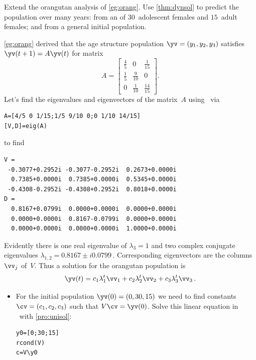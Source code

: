 \begin{example} \label{eg:orangs}
Extend the orangutan analysis of \autoref{eg:orang}. 
Use \autoref{thm:dynsol} to predict the population over many years: from an  of \(30\)~adolescent females and \(15\)~adult females; and from a general initial population.
\begin{solution} 
\autoref{eg:orang} derived that the age structure population \(\yv=(y_1,y_2,y_3)\) satisfies \(\yv(t+1)=A\yv(t)\) for matrix
\begin{equation*}
A=\begin{bmatrix} \frac45&0&\frac1{15}
\\\frac15&\frac9{10}&0
\\0&\frac1{10}&\frac{14}{15} \end{bmatrix}.
\end{equation*}
Let's find the eigenvalues and eigenvectors of the matrix~\(A\) using \script\ via
\begin{verbatim}
A=[4/5 0 1/15;1/5 9/10 0;0 1/10 14/15]
[V,D]=eig(A)
\end{verbatim}
\setbox\ajrqrbox\hbox{}%
\marginpar{\usebox{\ajrqrbox}}%
to find
\begin{verbatim}
V =
 -0.3077+0.2952i -0.3077-0.2952i  0.2673+0.0000i
  0.7385+0.0000i  0.7385+0.0000i  0.5345+0.0000i
 -0.4308-0.2952i -0.4308+0.2952i  0.8018+0.0000i
D =
  0.8167+0.0799i  0.0000+0.0000i  0.0000+0.0000i
  0.0000+0.0000i  0.8167-0.0799i  0.0000+0.0000i
  0.0000+0.0000i  0.0000+0.0000i  1.0000+0.0000i
\end{verbatim}
Evidently there is one real eigenvalue of \(\lambda_3=1\) and two complex conjugate eigenvalues \(\lambda_{1,2}=0.8167\pm i0.0799\)\,.
Corresponding eigenvectors are the columns~\(\vv_j\) of~\(V\).
Thus a solution for the orangutan population is
\begin{equation*}
\yv(t)=c_1\lambda_1^t\vv_1+c_2\lambda_2^t\vv_2+c_3\lambda_3^t\vv_3\,.
\end{equation*}
\begin{itemize}
\item For the initial population \(\yv(0)=(0,30,15)\) we need to find constants \(\cv=(c_1,c_2,c_3)\) such that \(V\cv=\yv(0)\).
Solve this linear equation in \script\ with \autoref{pro:unisol}:
\begin{verbatim}
y0=[0;30;15]
rcond(V)
c=V\y0
\end{verbatim}

\end{itemize}
\end{solution}
\end{example}
